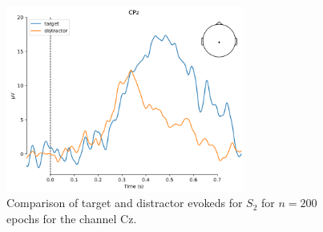 \documentclass[a4paper]{article}
\begin{document}
\begin{figure}[tbh!] 
  \centering
     \includegraphics[width=0.7\textwidth]{mrCompEvokeds.png}
  \caption{Comparison of target and distractor evokeds for $S_2$ for $n=200$ epochs for the channel Cz.}
  \label{fig:mrCompEvokeds}
\end{figure}

\end{document}
